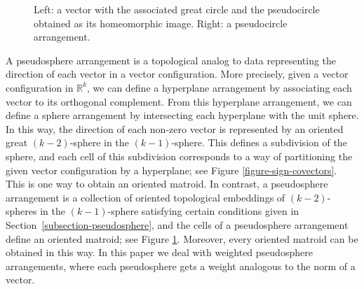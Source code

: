 \documentclass[JEP,XML,SOM,Unicode,NoFloatCountersInSection,published]{cedram}
\theoremstyle{remark}
\let\mb\mathbb
\begin{document}
\begin{figure}[htb]
\begin{center}
\end{center}

\caption{Left: a vector with the associated great circle and the pseudocircle obtained as its homeomorphic image.
Right: a pseudocircle arrangement.}
\label{figure-pseudosphere}

\end{figure}

A pseudosphere arrangement is a topological analog to data representing the direction of each vector in a vector configuration.
More precisely, given a vector configuration in $\mb{R}^k$, we can define a hyperplane arrangement by associating each vector to its orthogonal complement. From this hyperplane arrangement, we can define a sphere arrangement by intersecting each hyperplane with the unit sphere. In this way, the direction of each non-zero vector is represented by an oriented great $(k{-}2)$-sphere in the $(k{-}1)$-sphere.
This defines a subdivision of the sphere, and each cell of this subdivision corresponds to a way of partitioning the given vector configuration by a hyperplane; see Figure \ref{figure-sign-covectors}. This is one way to obtain an oriented matroid.
In contrast, a pseudosphere arrangement is a collection of oriented topological embeddings of $(k{-}2)$-spheres in the $(k{-}1)$-sphere satisfying certain conditions given in Section~\ref{subsection-pseudosphere}, and the cells of a pseudosphere arrangement define an oriented matroid; see Figure \ref{figure-pseudosphere}. Moreover, every oriented matroid can be obtained in this way.
In this paper we deal with weighted pseudosphere arrangements, where each pseudosphere gets a weight analogous to the norm of a vector.
\end{document}
